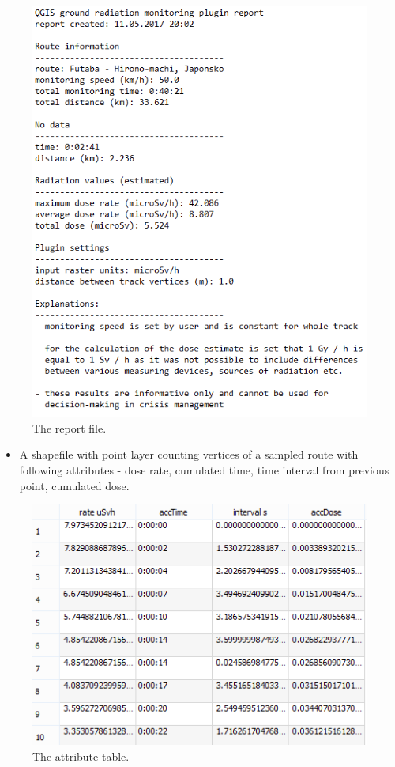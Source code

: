 \begin{figure}[H]
\centering
\includegraphics{pictures/user_guide/report.png}
\caption{The report file.}
\end{figure}

\begin{itemize}

\item
  A shapefile with point layer counting vertices of a sampled route with
  following attributes - dose rate, cumulated time, time interval from
  previous point, cumulated dose.
\end{itemize}

\begin{figure}[H]
\centering
\includegraphics{pictures/user_guide/shapefile.png}
\caption{The attribute table.}
\end{figure}

